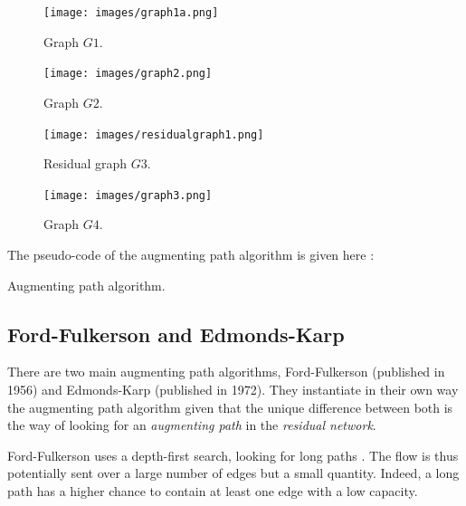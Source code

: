 \begin{figure}[h]
   \begin{minipage}[b]{0.40\linewidth}
      \centering \texttt{[image: images/graph1a.png]}
      \caption{Graph $G1$.}
   \end{minipage}\hfill
   \begin{minipage}[b]{0.48\linewidth}   
      \centering \texttt{[image: images/graph2.png]}
      \caption{Graph $G2$.}
   \end{minipage}\hfill
   \begin{minipage}[b]{0.48\linewidth}   
      \centering \texttt{[image: images/residualgraph1.png]}
      \caption{Residual graph $G3$.}
   \end{minipage}\hfill
   \begin{minipage}[b]{0.48\linewidth}  
      \centering \texttt{[image: images/graph3.png]}
      \caption{Graph $G4$.}
   \end{minipage}
\end{figure}


The pseudo-code of the augmenting path algorithm is given here :

\begin{algorithm}[h]

 \caption{Augmenting path algorithm.}
\end{algorithm}

\newpage
\subsection{Ford-Fulkerson and Edmonds-Karp}
There are two main augmenting path algorithms, Ford-Fulkerson (published in 1956) and Edmonds-Karp (published in 1972). They instantiate in their own way the augmenting path algorithm given that the unique difference between both is the way of looking for an \textit{augmenting path} in the \textit{residual network}. \newline

Ford-Fulkerson uses a depth-first search, looking for long paths \cite{lectu5}. The flow is thus potentially sent over a large number of edges but a small quantity. Indeed, a long path has a higher chance to contain at least one edge with a low capacity. \newline

